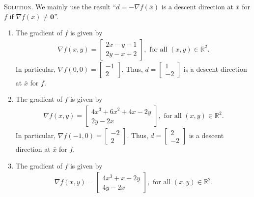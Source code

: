 \documentclass[a4paper]{article}
\numberwithin{equation}{section}
\begin{document}
\textsc{Solution.} We mainly use the result ``$d =  - \nabla f\left( {\bar x} \right)$ is a descent direction at $\bar x$ for $f$ if $\nabla f\left( {\bar x} \right) \ne \mathbf{0}$''.
\begin{enumerate}
\item The gradient of $f$ is given by
\begin{align}
\nabla f\left( {x,y} \right) = \left[ {\begin{array}{*{20}{c}}
{2x - y - 1}\\
{2y - x + 2}
\end{array}} \right], \mbox{ for all } \left( {x,y} \right) \in {\mathbb{R}^2}.
\end{align}
In particular, $\nabla f\left( {0,0} \right) = \left[ {\begin{array}{*{20}{c}}
{ - 1}\\
2
\end{array}} \right]$. Thus, $d = \left[ {\begin{array}{*{20}{c}}
1\\
{ - 2}
\end{array}} \right]$ is a descent direction at $\bar x$ for $f$.
\item The gradient of $f$ is given by
\begin{align}
\nabla f\left( {x,y} \right) = \left[ {\begin{array}{*{20}{c}}
{4{x^3} + 6{x^2} + 4x - 2y}\\
{2y - 2x}
\end{array}} \right], \mbox{ for all } \left( {x,y} \right) \in {\mathbb{R}^2}.
\end{align}
In particular, $\nabla f\left( { - 1,0} \right) = \left[ {\begin{array}{*{20}{c}}
{ - 2}\\
2
\end{array}} \right]$. Thus, $d = \left[ {\begin{array}{*{20}{c}}
2\\
{ - 2}
\end{array}} \right]$ is a descent direction at $\bar x$ for $f$.
\item The gradient of $f$ is given by
\begin{align}
\nabla f\left( {x,y} \right) = \left[ {\begin{array}{*{20}{c}}
{4{x^3} + x - 2y}\\
{4y - 2x}
\end{array}} \right],\mbox{ for all } \left( {x,y} \right) \in {\mathbb{R}^2}.
\end{align}

\end{enumerate}
\end{document}
